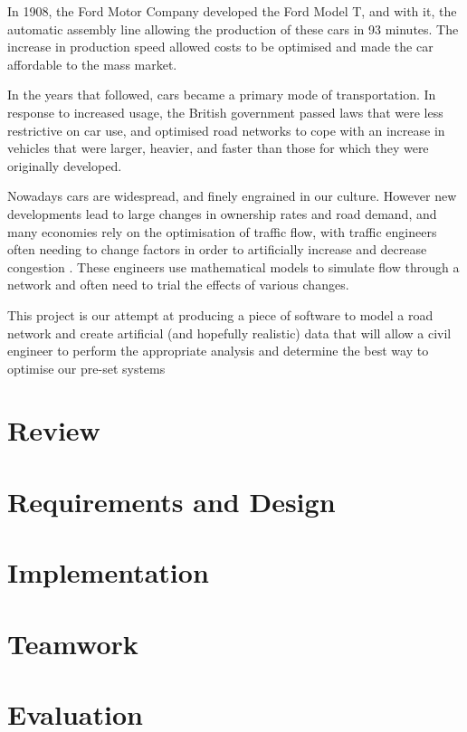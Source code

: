 \documentclass[titlepage]{article}
\begin{document}
	In 1908, the Ford Motor Company developed the Ford Model T, and with it, the automatic assembly line allowing the production of these cars in 93 minutes. The increase in production speed allowed costs to be optimised and made the car affordable to the mass market.
	
	In the years that followed, cars became a primary mode of transportation. In response to increased usage, the British government passed laws that were less restrictive on car use, and optimised road networks to cope with an increase in vehicles that were larger, heavier, and faster than those for which they were originally developed.
	
	Nowadays cars are widespread, and finely engrained in our culture\cite{miller2001car}\cite{berdahl2000go}. However new developments lead to large changes in ownership rates and road demand, and many economies rely on the optimisation of traffic flow, with traffic engineers often needing to change factors in order to artificially increase and decrease congestion \cite{blunden1983congestion}. These engineers use mathematical models to simulate flow through a network and often need to trial the effects of various changes.
	
	This project is our attempt at producing a piece of software to model a road network and create artificial (and hopefully realistic) data that will allow a civil engineer to perform the appropriate analysis and determine the best way to optimise our pre-set systems 

\section{Review}

\section{Requirements and Design}

\section{Implementation}

\section{Teamwork}

\section{Evaluation}
\end{document}
